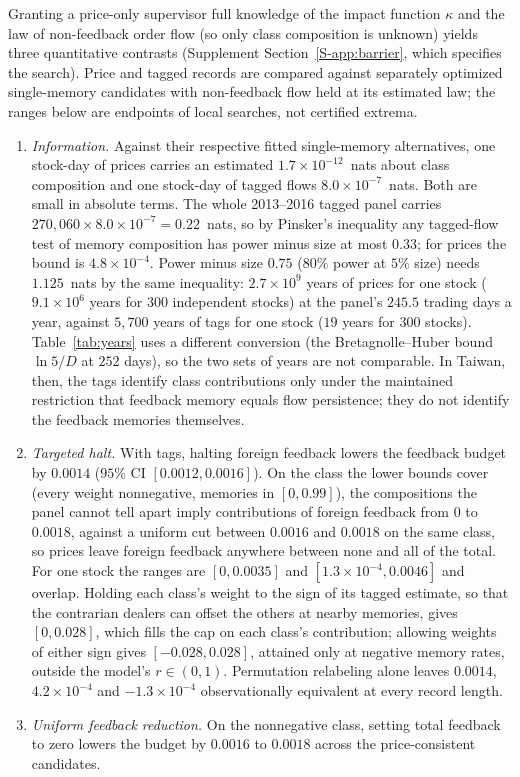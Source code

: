 \documentclass[11pt,letterpaper]{article}
\theoremstyle{definition}
\begin{document}
Granting a price-only supervisor full knowledge of the impact function $\kappa$ and the law of non-feedback order flow (so only class composition is unknown) yields three quantitative contrasts (Supplement Section~\ref{S-app:barrier}, which specifies the search). Price and tagged records are compared against separately optimized single-memory candidates with non-feedback flow held at its estimated law; the ranges below are endpoints of local searches, not certified extrema.
\begin{enumerate}
  \item \emph{Information.} Against their respective fitted single-memory alternatives, one stock-day of prices carries an estimated $1.7 \times 10^{-12}$~nats about class composition and one stock-day of tagged flows $8.0 \times 10^{-7}$~nats. Both are small in absolute terms. The whole 2013--2016 tagged panel carries $270{,}060 \times 8.0 \times 10^{-7} = 0.22$~nats, so by Pinsker's inequality any tagged-flow test of memory composition has power minus size at most $0.33$; for prices the bound is $4.8 \times 10^{-4}$. Power minus size $0.75$ ($80\%$ power at $5\%$ size) needs $1.125$~nats by the same inequality: $2.7 \times 10^9$ years of prices for one stock ($9.1 \times 10^6$ years for 300 independent stocks) at the panel's $245.5$ trading days a year, against $5{,}700$ years of tags for one stock ($19$ years for 300 stocks). Table~\ref{tab:years} uses a different conversion (the Bretagnolle--Huber bound $\ln 5/D$ at $252$ days), so the two sets of years are not comparable. In Taiwan, then, the tags identify class contributions only under the maintained restriction that feedback memory equals flow persistence; they do not identify the feedback memories themselves.
  \item \emph{Targeted halt.} With tags, halting foreign feedback lowers the feedback budget by $0.0014$ ($95\%$ CI $[0.0012, 0.0016]$). On the class the lower bounds cover (every weight nonnegative, memories in $[0, 0.99]$), the compositions the panel cannot tell apart imply contributions of foreign feedback from $0$ to $0.0018$, against a uniform cut between $0.0016$ and $0.0018$ on the same class, so prices leave foreign feedback anywhere between none and all of the total. For one stock the ranges are $[0, 0.0035]$ and $[1.3 \times 10^{-4}, 0.0046]$ and overlap. Holding each class's weight to the sign of its tagged estimate, so that the contrarian dealers can offset the others at nearby memories, gives $[0, 0.028]$, which fills the cap on each class's contribution; allowing weights of either sign gives $[-0.028, 0.028]$, attained only at negative memory rates, outside the model's $r \in (0, 1)$. Permutation relabeling alone leaves $0.0014$, $4.2 \times 10^{-4}$ and $-1.3 \times 10^{-4}$ observationally equivalent at every record length.
  \item \emph{Uniform feedback reduction.} On the nonnegative class, setting total feedback to zero lowers the budget by $0.0016$ to $0.0018$ across the price-consistent candidates.
\end{enumerate}
\end{document}
